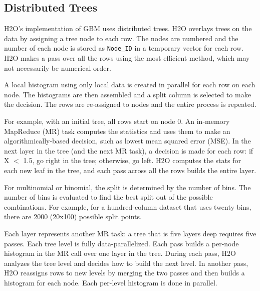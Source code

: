 
\subsection{Distributed Trees}

H2O's implementation of GBM uses distributed trees. H2O overlays trees on the data by assigning a tree node to each row.
The nodes are numbered and the number of each node is stored as {\texttt{Node\_ID}} in a temporary vector for each row. H2O makes a pass over all the rows using the most efficient method, which may not necessarily be  numerical order. 

A local
histogram using only local data is created in parallel for each row on each node. The histograms are then assembled and a split column is selected to make the decision. The rows are re-assigned to nodes and the entire process is repeated.

For example, with an initial tree, all rows start on node 0. An in-memory MapReduce (MR) task computes the statistics and uses
them to make an algorithmically-based decision, such as lowest mean squared error (MSE). In the next layer in the
tree (and the next MR task), a decision is made for each row: if X $<$ 1.5, go right in the tree; otherwise, go left.
H2O computes the stats for each new leaf in the tree, and each pass across all the rows builds the entire layer.

For multinomial or binomial, the split is determined by the number of bins. The number of bins is evaluated to
find the best split out of the possible combinations. For example, for a hundred-column dataset that uses twenty bins,
there are 2000 (20x100) possible split points.

Each layer represents another MR task: a tree that is five layers deep requires five passes. Each tree
level is fully data-parallelized. Each pass  builds a per-node histogram in the MR call over one layer in the tree.  During each pass, H2O analyzes the tree level and decides how to build the next level. In another pass, H2O reassigns rows to new levels by merging the two passes and then builds a histogram for each node. Each per-level histogram is done in parallel.

